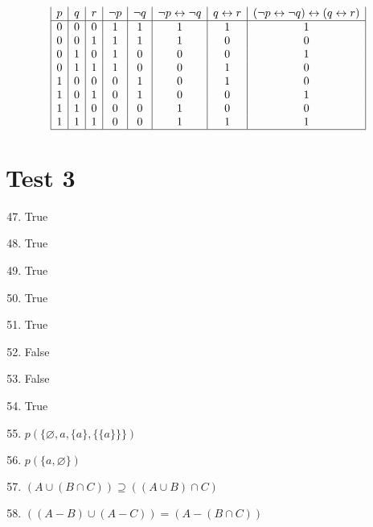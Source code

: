 \documentclass[12pt]{article}
\newcommand{\comment}[1]{}
\newcommand{\enumset}[1]{\setcounter{enumi}{#1}}
\newcommand{\lrarr}{\leftrightarrow}
\begin{document}
\begin{enumerate}
\begin{tasks}
\[\begin{array}{|*{8}{c|}}
									p & q & r & \lnot p & \lnot q & \lnot p \lrarr \lnot q & q \lrarr r & (\lnot p \lrarr \lnot q) \lrarr (q \lrarr r) \\\hline
									0 & 0 & 0 & 1 & 1 & 1 & 1 & 1 \\
									0 & 0 & 1 & 1 & 1 & 1 & 0 & 0 \\
									0 & 1 & 0 & 1 & 0 & 0 & 0 & 1 \\
									0 & 1 & 1 & 1 & 0 & 0 & 1 & 0 \\
									1 & 0 & 0 & 0 & 1 & 0 & 1 & 0 \\
									1 & 0 & 1 & 0 & 1 & 0 & 0 & 1 \\
									1 & 1 & 0 & 0 & 0 & 1 & 0 & 0 \\
									1 & 1 & 1 & 0 & 0 & 1 & 1 & 1 \\\hline
								\end{array}\]

						\end{tasks}
			\end{enumerate}
	\section*{Test 3}
		\begin{enumerate}
			\enumset{46}
			\item
				True
			\item
				True 
			\item
				True
			\item
				True
			\item
				True
			\item
				False
			\item
				False
			\item
				True
			\enumset{18}
			\item
				\(p(\{\varnothing, a, \{a\}, \{\{a\}\}\})\)
			\enumset{21}
			\item
				\(p(\{a, \varnothing\})\)
			\enumset{15}
			\item
				\((A \cup (B \cap C)) \supseteq ((A \cup B) \cap C)\)
			\item
				\(((A - B) \cup (A - C)) = (A - (B \cap C))\)
			\comment{
				\enumset{12}
				\item
				\enumset{159}
				\item
					\(a_n = 4n + 1\)
				\enumset{162}
				\item
					\(a_n = 1.1 - 0.1n\)
				\enumset{172}
				\item
					\(a_{n} = \dfrac{na_{n - 1}}{n + 1}\), \(a_1 = \dfrac{1}{2}\)
				\item
					\(a_n = a_{n - 1} + 10^{-n}\), \(a_1 = 0.1\)
				\enumset{183}
				\item
					\begin{align*}
						a_{n + 1} &= 2(n + 1) = 2n + 2 = a_n + 2	
					\end{align*}
			}
		\end{enumerate}
\end{document}
